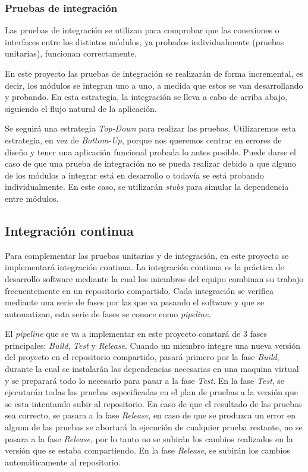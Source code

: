 \subsubsection{Pruebas de integración}
Las pruebas de integración se utilizan para comprobar que las conexiones o interfaces entre los distintos módulos, ya probados individualmente (pruebas unitarias), funcionan correctamente.

En este proyecto las pruebas de integración se realizarán de forma incremental, es decir, los módulos se integran uno a uno, a medida que estos se van desarrollando y probando. En esta estrategia, la integración se lleva a cabo de arriba abajo, siguiendo el flujo natural de la aplicación.

Se seguirá una estrategia \textit{Top-Down} para realizar las pruebas. Utilizaremos esta estrategia, en vez de \textit{Bottom-Up}, porque nos queremos centrar en errores de diseño y tener una aplicación funcional probada lo antes posible.
Puede darse el caso de que una prueba de integración no se pueda realizar debido a que alguno de los módulos a integrar está en desarrollo o todavía se está probando individualmente. En este caso, se utilizarán \textit{stubs} para simular la dependencia entre módulos.
\subsection{Integración continua}
Para complementar las pruebas unitarias y de integración, en este proyecto se implementará integración continua. La integración continua es la práctica de desarrollo software mediante la cual los miembros del equipo combinan su trabajo frecuentemente en un repositorio compartido. Cada integración se verifica mediante una serie de fases por las que va pasando el software y que se automatizan, esta serie de fases se conoce como \textit{pipeline}.

El \textit{pipeline} que se va a implementar en este proyecto constará de 3 fases principales: \textit{Build}, \textit{Test} y \textit{Release}. Cuando un miembro integre una nueva versión del proyecto en el repositorio compartido, pasará primero por la fase \textit{Build}, durante la cual se instalarán las dependencias necesarias en una maquina virtual y se preparará todo lo necesario para pasar a la fase \textit{Test}. En la fase \textit{Test}, se ejecutarán todas las pruebas especificadas en el plan de pruebas a la versión que se esta intentando subir al repositorio. En caso de que el resultado de las pruebas sea correcto, se pasara a la fase \textit{Release}, en caso de que se produzca un error en alguna de las pruebas se abortará la ejecución de cualquier prueba restante, no se pasara a la fase \textit{Release}, por lo tanto no se subirán los cambios realizados en la versión que se estaba compartiendo. En la fase \textit{Release}, se subirán los cambios automáticamente al repositorio.

